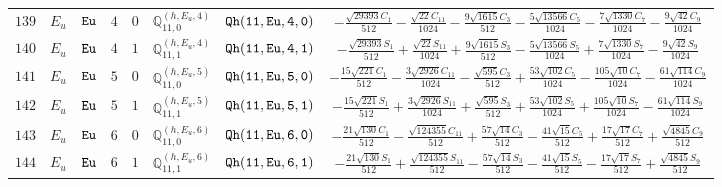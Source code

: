 \documentclass[fleqn,8pt]{jsarticle}
\begin{document}
\begin{table}[ht!]
\begin{center}
\begin{tabular}{cccccccc}
$ 139 $ & $ E_{u} $ & $ {\tt Eu} $ & $ 4 $ & $ 0 $ & $ \mathbb{Q}_{11,0}^{(h,E_{u},4)} $ & $ {\tt Qh(11,Eu,4,0)} $ & $ - \frac{\sqrt{29393} C_{1}}{512} - \frac{\sqrt{22} C_{11}}{1024} - \frac{9 \sqrt{1615} C_{3}}{512} - \frac{5 \sqrt{13566} C_{5}}{1024} - \frac{7 \sqrt{1330} C_{7}}{1024} - \frac{9 \sqrt{42} C_{9}}{1024} $ \\
$ 140 $ & $ E_{u} $ & $ {\tt Eu} $ & $ 4 $ & $ 1 $ & $ \mathbb{Q}_{11,1}^{(h,E_{u},4)} $ & $ {\tt Qh(11,Eu,4,1)} $ & $ - \frac{\sqrt{29393} S_{1}}{512} + \frac{\sqrt{22} S_{11}}{1024} + \frac{9 \sqrt{1615} S_{3}}{512} - \frac{5 \sqrt{13566} S_{5}}{1024} + \frac{7 \sqrt{1330} S_{7}}{1024} - \frac{9 \sqrt{42} S_{9}}{1024} $ \\
$ 141 $ & $ E_{u} $ & $ {\tt Eu} $ & $ 5 $ & $ 0 $ & $ \mathbb{Q}_{11,0}^{(h,E_{u},5)} $ & $ {\tt Qh(11,Eu,5,0)} $ & $ - \frac{15 \sqrt{221} C_{1}}{512} - \frac{3 \sqrt{2926} C_{11}}{1024} - \frac{\sqrt{595} C_{3}}{512} + \frac{53 \sqrt{102} C_{5}}{1024} - \frac{105 \sqrt{10} C_{7}}{1024} - \frac{61 \sqrt{114} C_{9}}{1024} $ \\
$ 142 $ & $ E_{u} $ & $ {\tt Eu} $ & $ 5 $ & $ 1 $ & $ \mathbb{Q}_{11,1}^{(h,E_{u},5)} $ & $ {\tt Qh(11,Eu,5,1)} $ & $ - \frac{15 \sqrt{221} S_{1}}{512} + \frac{3 \sqrt{2926} S_{11}}{1024} + \frac{\sqrt{595} S_{3}}{512} + \frac{53 \sqrt{102} S_{5}}{1024} + \frac{105 \sqrt{10} S_{7}}{1024} - \frac{61 \sqrt{114} S_{9}}{1024} $ \\
$ 143 $ & $ E_{u} $ & $ {\tt Eu} $ & $ 6 $ & $ 0 $ & $ \mathbb{Q}_{11,0}^{(h,E_{u},6)} $ & $ {\tt Qh(11,Eu,6,0)} $ & $ - \frac{21 \sqrt{130} C_{1}}{512} - \frac{\sqrt{124355} C_{11}}{512} + \frac{57 \sqrt{14} C_{3}}{512} - \frac{41 \sqrt{15} C_{5}}{512} + \frac{17 \sqrt{17} C_{7}}{512} + \frac{\sqrt{4845} C_{9}}{512} $ \\
$ 144 $ & $ E_{u} $ & $ {\tt Eu} $ & $ 6 $ & $ 1 $ & $ \mathbb{Q}_{11,1}^{(h,E_{u},6)} $ & $ {\tt Qh(11,Eu,6,1)} $ & $ - \frac{21 \sqrt{130} S_{1}}{512} + \frac{\sqrt{124355} S_{11}}{512} - \frac{57 \sqrt{14} S_{3}}{512} - \frac{41 \sqrt{15} S_{5}}{512} - \frac{17 \sqrt{17} S_{7}}{512} + \frac{\sqrt{4845} S_{9}}{512} $ \\
 \hline \hline
\end{tabular}
\end{center}
\end{table}
\end{document}

